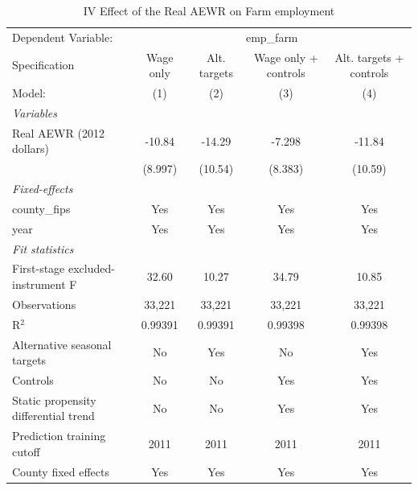 
\begin{table}[htbp]
   \caption{\label{tab:iv_farm_employment} IV Effect of the Real AEWR on Farm employment}
   \centering
   \begin{tabular}{lcccc}
      \tabularnewline \midrule \midrule
      Dependent Variable: & \multicolumn{4}{c}{emp\_farm}\\
      Specification                        & Wage only & Alt. targets & Wage only + controls & Alt. targets + controls \\   
      Model:                               & (1)       & (2)          & (3)                  & (4)\\  
      \midrule
      \emph{Variables}\\
      Real AEWR (2012 dollars)             & -10.84    & -14.29       & -7.298               & -11.84\\   
                                           & (8.997)   & (10.54)      & (8.383)              & (10.59)\\   
      \midrule
      \emph{Fixed-effects}\\
      county\_fips                         & Yes       & Yes          & Yes                  & Yes\\  
      year                                 & Yes       & Yes          & Yes                  & Yes\\  
      \midrule
      \emph{Fit statistics}\\
      First-stage excluded-instrument F    & 32.60     & 10.27        & 34.79                & 10.85\\  
      Observations                         & 33,221    & 33,221       & 33,221               & 33,221\\  
      R$^2$                                & 0.99391   & 0.99391      & 0.99398              & 0.99398\\  
      Alternative seasonal targets         & No        & Yes          & No                   & Yes\\  
      Controls                             & No        & No           & Yes                  & Yes\\  
      Static propensity differential trend & No        & No           & Yes                  & Yes\\  
      Prediction training cutoff           & 2011      & 2011         & 2011                 & 2011\\  
      County fixed effects                 & Yes       & Yes          & Yes                  & Yes\\  

\end{tabular}
\end{table}
